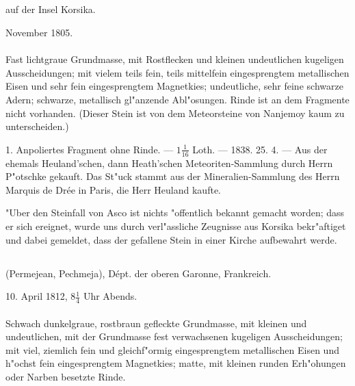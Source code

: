 \documentclass[a4paper, 11pt, oneside, polutonikogreek, german]{article}
\begin{document}
\subsection[\swabfamily {Asco.}]{}
\begin{center}

auf der Insel Korsika.

November 1805.
\end{center}
\paragraph{}
Fast lichtgraue Grundmasse, mit Rostflecken und kleinen undeutlichen kugeligen Ausscheidungen; mit vielem teils fein, teils mittelfein eingesprengtem metallischen Eisen und sehr fein eingesprengtem Magnetkies; undeutliche, sehr feine schwarze Adern; schwarze, metallisch gl"anzende Abl"osungen. Rinde ist an dem Fragmente nicht vorhanden. (Dieser Stein ist von dem Meteorsteine von Nanjemoy kaum zu unterscheiden.)

1. Anpoliertes Fragment ohne Rinde. --- $\mathfrak{1\frac{1}{16}}$ Loth. --- 1838. 25. 4. --- Aus der ehemals Heuland'schen, dann Heath'schen Meteoriten-Sammlung durch Herrn P"otschke gekauft. Das St"uck stammt aus der Mineralien-Sammlung des Herrn Marquis de Drée in Paris, die Herr Heuland kaufte.

\setlength{\leftskip}{10mm}
\setlength{\parindent}{0pt}

{\footnotesize "Uber den Steinfall von Asco ist nichts "offentlich bekannt gemacht worden; dass er sich ereignet, wurde uns durch verl"assliche Zeugnisse aus Korsika bekr"aftiget und dabei gemeldet, dass der gefallene Stein in einer Kirche aufbewahrt werde.}

\setlength{\leftskip}{0pt}
\setlength{\parindent}{20pt}

\subsection{}
\begin{center}

(Permejean, Pechmeja), Dépt. der oberen Garonne, Frankreich.

10. April 1812, $\mathfrak{8\frac{1}{4}}$ Uhr Abends.
\end{center}
\paragraph{}
Schwach dunkelgraue, rostbraun gefleckte Grundmasse, mit kleinen und undeutlichen, mit der Grundmasse fest verwachsenen kugeligen Ausscheidungen; mit viel, ziemlich fein und gleichf"ormig eingesprengtem metallischen Eisen und h"ochst fein eingesprengtem Magnetkies; matte, mit kleinen runden Erh"ohungen oder Narben besetzte Rinde.
\end{document}
